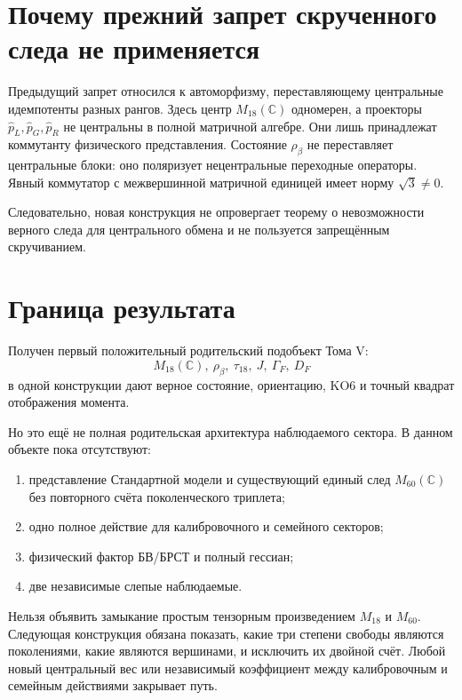 \section{Почему прежний запрет скрученного следа не применяется}

Предыдущий запрет относился к автоморфизму, переставляющему центральные
идемпотенты разных рангов. Здесь центр \(M_{18}(\mathbb C)\) одномерен, а
проекторы \(\widehat p_L,\widehat p_G,\widehat p_R\) не центральны в полной матричной алгебре. Они
лишь принадлежат коммутанту физического представления. Состояние
\(\rho_\beta\) не переставляет центральные блоки: оно поляризует
нецентральные переходные операторы. Явный коммутатор с межвершинной
матричной единицей имеет норму \(\sqrt3\ne0\).

Следовательно, новая конструкция не опровергает теорему о невозможности
верного следа для центрального обмена и не пользуется запрещённым
скручиванием.

\section{Граница результата}

Получен первый положительный родительский подобъект Тома V:
\begin{equation}
 \boxed{
 M_{18}(\mathbb C),\ \rho_\beta,\ \tau_{18},\ J,\ \Gamma_F,\ D_F
 }
\end{equation}
в одной конструкции дают верное состояние, ориентацию, KO6 и точный
квадрат отображения момента.

Но это ещё не полная родительская архитектура наблюдаемого сектора. В
данном объекте пока отсутствуют:
\begin{enumerate}
 \item представление Стандартной модели и существующий единый след
 \(M_{60}(\mathbb C)\) без повторного счёта поколенческого триплета;
 \item одно полное действие для калибровочного и семейного секторов;
 \item физический фактор БВ/БРСТ и полный гессиан;
 \item две независимые слепые наблюдаемые.
\end{enumerate}

\begin{nogocriterion}
Нельзя объявить замыкание простым тензорным произведением \(M_{18}\) и
\(M_{60}\). Следующая конструкция обязана показать, какие три степени
свободы являются поколениями, какие являются вершинами, и исключить их
двойной счёт. Любой новый центральный вес или независимый коэффициент
между калибровочным и семейным действиями закрывает путь.
\end{nogocriterion}

